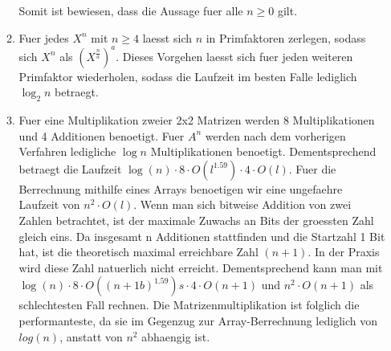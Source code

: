 \documentclass{article}
\begin{document}
\begin{enumerate}
\begin{enumerate}
                Somit ist bewiesen, dass die Aussage fuer alle $n \geq 0$ gilt.
            \item
                Fuer jedes $X^n$ mit $n \geq 4$ laesst sich $n$ in Primfaktoren zerlegen, sodass sich $X^n$ als $(X^{\frac{n}{a}})^a$. Dieses Vorgehen laesst sich fuer jeden weiteren Primfaktor wiederholen, sodass die Laufzeit im besten Falle lediglich $\log_2{n}$ betraegt.
            \item
                Fuer eine Multiplikation zweier 2x2 Matrizen werden 8 Multiplikationen und 4 Additionen benoetigt. Fuer $A^n$ werden nach dem vorherigen Verfahren ledigliche $\log{n}$ Multiplikationen benoetigt. Dementsprechend betraegt die Laufzeit $\log(n) \cdot 8 \cdot O(l^{1.59}) \cdot 4 \cdot O(l)$. Fuer die Berrechnung mithilfe eines Arrays benoetigen wir eine ungefaehre Laufzeit von $n^2 \cdot O(l)$.
                Wenn man sich bitweise Addition von zwei Zahlen betrachtet, ist der maximale Zuwachs an Bits der groessten Zahl gleich eins. Da insgesamt n Additionen stattfinden und die Startzahl 1 Bit hat, ist die theoretisch maximal erreichbare Zahl $(n+1)$. In der Praxis wird diese Zahl natuerlich nicht erreicht.
                Dementsprechend kann man mit $\log(n) \cdot 8 \cdot O((n+1b)^{1.59})s \cdot 4 \cdot O(n+1)$ und $n^{2} \cdot O(n+1)$ als schlechtesten Fall rechnen. Die Matrizenmultiplikation ist folglich die performanteste, da sie im Gegenzug zur Array-Berrechnung lediglich von $log(n)$, anstatt von $n^2$ abhaengig ist. 
        \end{enumerate}
    \end{enumerate}
\end{document}
